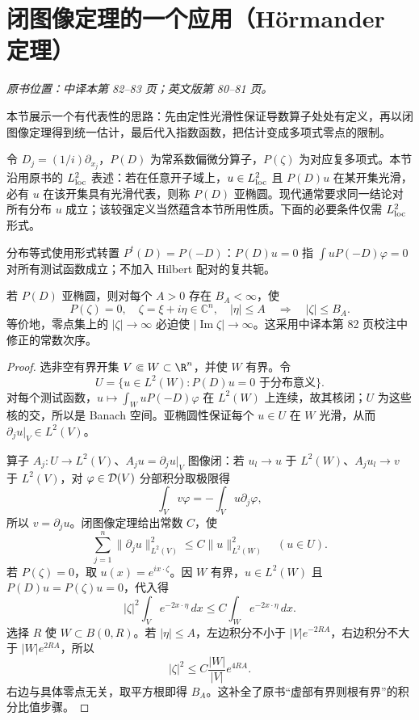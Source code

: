 \section{闭图像定理的一个应用（H\"ormander 定理）}\label{sec:yosida-02-07}
\noindent\textit{原书位置：中译本第 82--83 页；英文版第 80--81 页。}

本节展示一个有代表性的思路：先由定性光滑性保证导数算子处处有定义，再以闭图像定理得到统一估计，最后代入指数函数，把估计变成多项式零点的限制。

\begin{definition}[本节使用的亚椭圆性]
令 $D_j=(1/i)\partial_{x_j}$，$P(D)$ 为常系数偏微分算子，$P(\zeta)$ 为对应复多项式。本节沿用原书的 $L^2_{\mathrm{loc}}$ 表述：若在任意开子域上，$u\in L^2_{\mathrm{loc}}$ 且 $P(D)u$ 在某开集光滑，必有 $u$ 在该开集具有光滑代表，则称 $P(D)$ 亚椭圆。现代通常要求同一结论对所有分布 $u$ 成立；该较强定义当然蕴含本节所用性质。下面的必要条件仅需 $L^2_{\mathrm{loc}}$ 形式。
\end{definition}

分布等式使用形式转置 $P^t(D)=P(-D)$：$P(D)u=0$ 指 $\int uP(-D)\varphi=0$ 对所有测试函数成立；不加入 Hilbert 配对的复共轭。

\begin{theorem}\label{thm:y2-hormander}
若 $P(D)$ 亚椭圆，则对每个 $A>0$ 存在 $B_A<\infty$，使
\[
 P(\zeta)=0,\quad\zeta=\xi+i\eta\in\mathbb C^n,\quad
 |\eta|\le A\quad\Longrightarrow\quad|\zeta|\le B_A.
\]
等价地，零点集上的 $|\zeta|\to\infty$ 必迫使 $|\operatorname{Im}\zeta|\to\infty$。这采用中译本第 82 页校注中修正的常数次序。
\end{theorem}
\begin{proof}
选非空有界开集 $V\Subset W\subset\R^n$，并使 $W$ 有界。令
\[
 U=\{u\in L^2(W):P(D)u=0\text{ 于分布意义}\}.
\]
对每个测试函数，$u\mapsto\int_WuP(-D)\varphi$ 在 $L^2(W)$ 上连续，故其核闭；$U$ 为这些核的交，所以是 Banach 空间。亚椭圆性保证每个 $u\in U$ 在 $W$ 光滑，从而 $\partial_ju|_V\in L^2(V)$。

算子 $A_j:U\to L^2(V)$、$A_ju=\partial_ju|_V$ 图像闭：若 $u_l\to u$ 于 $L^2(W)$、$A_ju_l\to v$ 于 $L^2(V)$，对 $\varphi\in\mathcal{D}(V)$ 分部积分取极限得
\[
 \int_Vv\varphi=-\int_Vu\partial_j\varphi,
\]
所以 $v=\partial_ju$。闭图像定理给出常数 $C$，使
\[
 \sum_{j=1}^n\|\partial_ju\|_{L^2(V)}^2
 \le C\|u\|_{L^2(W)}^2\quad(u\in U).
\]
若 $P(\zeta)=0$，取 $u(x)=e^{ix\cdot\zeta}$。因 $W$ 有界，$u\in L^2(W)$ 且 $P(D)u=P(\zeta)u=0$，代入得
\[
 |\zeta|^2\int_Ve^{-2x\cdot\eta}\,dx
 \le C\int_We^{-2x\cdot\eta}\,dx.
\]
选择 $R$ 使 $W\subset B(0,R)$。若 $|\eta|\le A$，左边积分不小于 $|V|e^{-2RA}$，右边积分不大于 $|W|e^{2RA}$，所以
\[
 |\zeta|^2\le C\frac{|W|}{|V|}e^{4RA}.
\]
右边与具体零点无关，取平方根即得 $B_A$。这补全了原书“虚部有界则根有界”的积分比值步骤。
\end{proof}

